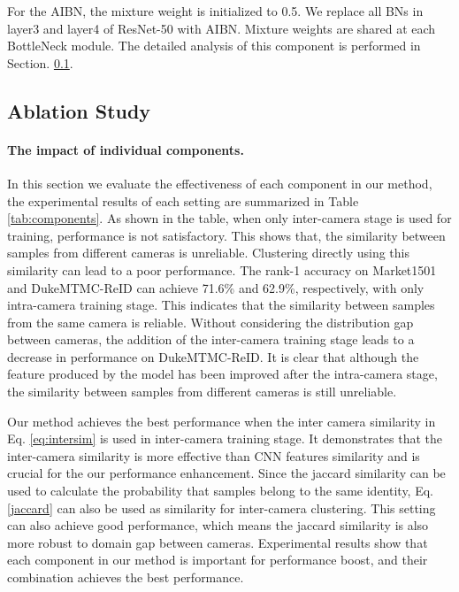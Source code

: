 \documentclass[final]{cvpr}
\begin{document}
For the AIBN, the mixture weight  is initialized to 0.5. We replace all BNs in layer3 and layer4 of ResNet-50 with AIBN. Mixture weights are shared at each BottleNeck module. The detailed analysis of this component is performed in Section. \ref{ablation}.
\subsection{Ablation Study}\label{ablation}
\paragraph{The impact of individual components.} In this section we evaluate the effectiveness of each component in our method, the experimental results of each setting are summarized in Table \ref{tab:components}.
As shown in the table, when only inter-camera stage is used for training, performance is not satisfactory. This shows that, the similarity between samples from different cameras is unreliable. Clustering directly using this similarity can lead to a poor performance.
The rank-1 accuracy on Market1501 and DukeMTMC-ReID can achieve 71.6\% and 62.9\%, respectively, with only intra-camera training stage. This indicates that the similarity between samples from the same camera is reliable.
Without considering the distribution gap between cameras, the addition of the inter-camera training stage leads to a decrease in performance on DukeMTMC-ReID. It is clear that although the feature produced by the model has been improved after the intra-camera stage, the similarity between samples from different cameras is still unreliable.

Our method achieves the best performance when the inter camera similarity in Eq. \eqref{eq:intersim} is used in inter-camera training stage. It demonstrates that the inter-camera similarity is more effective than CNN features similarity and is crucial for the our performance enhancement. 
Since the jaccard similarity can be used to calculate the probability that samples belong to the same identity, Eq. \eqref{jaccard} can also be used as similarity for inter-camera clustering. This setting can also achieve good performance, which means the jaccard similarity is also more robust to domain gap between cameras.
Experimental results show that each component in our method is important for performance boost, and their combination achieves the best performance.
\end{document}
